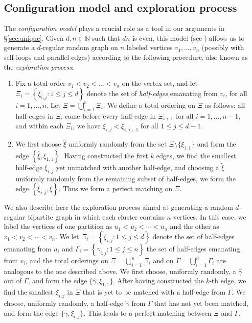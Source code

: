 \documentclass[11pt,reqno]{amsart}
\renewcommand{\theenumi}{\roman{enumi}}
\theoremstyle{definition}
\theoremstyle{remark}
\theoremstyle{conjecture}
\begin{document}
\subsection{Configuration model and exploration process}\label{configuration:subsec} The \emph{configuration model} plays a crucial role as a tool in our arguments in \S\ref{sec:unique}. Given $d, n \in \mathbb{N}$ such that $d n$ is even, this model (see \cite{07, 08}) allows us to generate a $d$-regular random graph on $n$ labeled vertices $v_{1}, \ldots, v_{n}$ (possibly with self-loops and parallel edges) according to the following procedure, also known as the \emph{exploration process}:
\renewcommand{\theenumi}{\roman{enumi}}
\begin{enumerate}
\item Fix a total order $v_{1} < v_{2} < \ldots < v_{n}$ on the vertex set, and let $\Xi_{i} = \left\{\xi_{i,j}: 1 \leqslant j \leqslant d\right\}$ denote the set of \emph{half-edges} emanating from $v_{i}$, for all $i = 1, \ldots, n$. Let $\Xi = \bigcup_{i=1}^{n} \Xi_{i}$. We define a total ordering on $\Xi$ as follows: all half-edges in $\Xi_{i}$ come before every half-edge in $\Xi_{i+1}$ for all $i = 1, \ldots, n-1$, and within each $\Xi_{i}$, we have $\xi_{i,j} < \xi_{i,j+1}$ for all $1 \leqslant j \leqslant d-1$.
\item We first choose $\hat{\xi}$ uniformly randomly from the set $\Xi \setminus \{\xi_{1,1}\}$ and form the edge $\left\{\hat{\xi}, \xi_{1,1}\right\}$. Having constructed the first $k$ edges, we find the smallest half-edge $\xi_{i,j}$ yet unmatched with another half-edge, and choosing a $\tilde{\xi}$ uniformly randomly from the remaining subset of half-edges, we form the edge $\left\{\xi_{i,j}, \tilde{\xi}\right\}$. Thus we form a perfect matching on $\Xi$. 
\end{enumerate}

We also describe here the exploration process aimed at generating a random $d$-regular bipartite graph in which each cluster contains $n$ vertices. In this case, we label the vertices of one partition as $u_{1} < u_{2} < \cdots < u_{n}$ and the other as $v_{1} < v_{2} < \cdots < v_{n}$. We let $\Xi_{i} = \left\{\xi_{i,j}: 1 \leqslant j \leqslant d\right\}$ denote the set of half-edges emanating from $u_{i}$ and $\Gamma_{i} = \left\{\gamma_{i,j}: 1 \leqslant j \leqslant n\right\}$ the set of half-edges emanating from $v_{i}$, and the total orderings on $\Xi = \bigcup_{i=1}^{n} \Xi_{i}$ and on $\Gamma = \bigcup_{i=1}^{n} \Gamma_{i}$ are analogous to the one described above. We first choose, uniformly randomly, a $\hat{\gamma}$ out of $\Gamma$, and form the edge $\{\hat{\gamma}, \xi_{1,1}\}$. After having constructed the $k$-th edge, we find the smallest $\xi_{i,j}$ in $\Xi$ that is yet to be matched with a half-edge from $\Gamma$. We choose, uniformly randomly, a half-edge $\tilde{\gamma}$ from $\Gamma$ that has not yet been matched, and form the edge $\{\tilde{\gamma}, \xi_{i,j}\}$. This leads to a perfect matching between $\Xi$ and $\Gamma$. 
\end{document}

